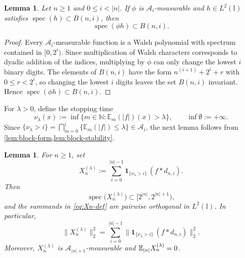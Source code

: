 \documentclass[11pt]{amsart}
\numberwithin{equation}{section}
\DeclareMathOperator{\spec}{spec}
\newtheorem{lemma}[theorem]{Lemma}
\theoremstyle{remark}
\begin{document}
\begin{lemma}
\label{lem:block-stability} Let $n\ge1$ and $0\le i<|n|$. If $\phi$ is $%
\mathcal{A}_i$-measurable and $h\in L^2(\mathbb{I})$ satisfies $\spec%
(h)\subset B(n,i)$, then 
\begin{equation*}
\spec(\phi h)\subset B(n,i). 
\end{equation*}
\end{lemma}

\begin{proof}
Every $\mathcal{A}_i$-measurable function is a Walsh polynomial with
spectrum contained in $[0,2^i)$. Since multiplication of Walsh characters
corresponds to dyadic addition of the indices, multiplying by $\phi$ can
only change the lowest $i$ binary digits. The elements of $B(n,i)$ have the
form $n^{(i+1)}+2^i+r$ with $0\le r<2^i$, so changing the lowest $i$ digits
leaves the set $B(n,i)$ invariant. Hence $\spec(\phi h)\subset B(n,i)$.
\end{proof}

For $\lambda>0$, define the stopping time 
\begin{equation}
\nu_\lambda(x):=\inf\bigl\{m\in\mathbb{N}:\mathbb{E}_m(\lvert
f\rvert)(x)>\lambda\bigr\}, \qquad \inf\emptyset:=+\infty.
\label{eq:stopping-time}
\end{equation}
Since $\{\nu_\lambda>i\}=\bigcap_{m=0}^i\{\mathbb{E}_m(\lvert
f\rvert)\le\lambda\}\in\mathcal{A}_i$, the next lemma follows from %
\cref{lem:block-form,lem:block-stability}.

\begin{lemma}
\label{lem:Xn-spectrum} For $n\ge1$, set 
\begin{equation}
X_n^{(\lambda)}:=\sum_{i=0}^{|n|-1}\mathbf{1}_{\{\nu_\lambda>i\}}%
\,(f*d_{n,i}).  \label{eq:Xn-def}
\end{equation}
Then 
\begin{equation}
\spec\bigl(X_n^{(\lambda)}\bigr)\subset [2^{|n|},2^{|n|+1}),
\label{eq:Xn-shell}
\end{equation}
and the summands in \eqref{eq:Xn-def} are pairwise orthogonal in $L^2(%
\mathbb{I})$. In particular, 
\begin{equation}
\lVert X_n^{(\lambda)}\rVert_2^2 =\sum_{i=0}^{|n|-1}\lVert \mathbf{1}%
_{\{\nu_\lambda>i\}}\,(f*d_{n,i})\rVert_2^2.  \label{eq:Xn-orth}
\end{equation}
Moreover, $X_n^{(\lambda)}$ is $\mathcal{A}_{|n|+1}$-measurable and $\mathbb{%
E}_{|n|}X_n^{(\lambda)}=0$.
\end{lemma}
\end{document}
